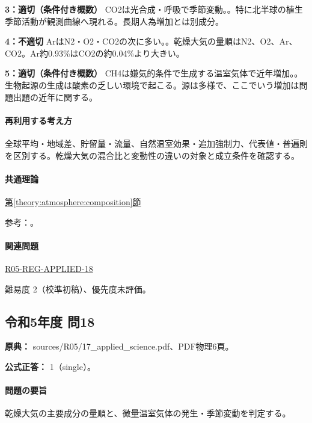 \noindent\textbf{3：適切（条件付き概数）} CO2は光合成・呼吸で季節変動。。特に北半球の植生季節活動が観測曲線へ現れる。長期人為増加とは別成分。\par

\noindent\textbf{4：不適切} ArはN2・O2・CO2の次に多い。。乾燥大気の量順はN2、O2、Ar、CO2。Ar約0.93\%はCO2の約0.04\%より大きい。\par

\noindent\textbf{5：適切（条件付き概数）} CH4は嫌気的条件で生成する温室気体で近年増加。。生物起源の生成は酸素の乏しい環境で起こる。源は多様で、ここでいう増加は問題出題の近年に関する。\par

\paragraph{再利用する考え方} 全球平均・地域差、貯留量・流量、自然温室効果・追加強制力、代表値・普遍則を区別する。乾燥大気の混合比と変動性の違いの対象と成立条件を確認する。

\paragraph{共通理論} \hyperref[theory:atmosphere:composition]{第\ref*{theory:atmosphere:composition}節}

\par 参考：\cite{atm_noaa_composition,atm_noaa_ghg}。

\paragraph{関連問題} \hyperref[q:r05-reg-applied-18]{R05-REG-APPLIED-18}

\par 難易度 2（校準初稿）、優先度未評価。

\subsection{令和5年度 問18}
\label{q:r05-reg-applied-18}

\noindent\textbf{原典：} sources/R05/17\_applied\_science.pdf、PDF物理6頁。

\textbf{公式正答：} 1（single）。

\paragraph{問題の要旨} 乾燥大気の主要成分の量順と、微量温室気体の発生・季節変動を判定する。

